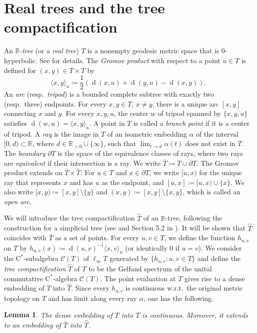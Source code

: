 \documentclass[12pt,nosumlimits,nonamelimits]{amsart}
\newtheorem{lem}[thm]{Lemma}
\theoremstyle{remark}
\theoremstyle{definition}
\newcommand{\IR}{\mathbb{R}}
\newcommand{\rC}{\mathrm{C}}
\newcommand{\cC}{\mathcal{C}}
\DeclareMathOperator{\dist}{d}
\newcommand{\ip}[1]{\mathopen{\langle}#1\mathclose{\rangle}}
\newcommand{\cst}{$\rC^*$-alge\-bra}
\begin{document}
\section{Real trees and the tree compactification}
%
%
An \emph{$\IR$-tree} (or a \emph{real tree}) $T$ 
is a nonempty geodesic metric space that is $0$-hyper\-bolic. 
See \cite{bestvina:survey,chiswell,evans} for details. 
The \emph{Gromov product} with respect 
to a point $u\in T$ is defined for $(x,y)\in T\times T$ by 
\[
\ip{x,y}_u \coloneq \frac{1}{2}(\dist(x,u)+\dist(y,u)-\dist(x,y)).
\] 
An \emph{arc}  (resp.\ \emph{tripod}) is a bounded complete 
subtree with exactly two (resp.\ three) endpoints. 
For every $x,y\in T$, $x\neq y$, there is a unique arc $[x,y]$ 
connecting $x$ and $y$. 
For every $x,y,u$, the center $w$ of tripod spanned by $\{x,y,u\}$ 
satisfies $\dist(w,u) = \ip{x,y}_u$. 
A point in $T$ is called a \emph{branch point} if it is a center of tripod. 
A \emph{ray} is the image in $T$ 
of an isometric embedding $\alpha$ 
of the interval $[0,d)\subset\IR$, 
where $d\in\IR_{>0}\cup\{\infty\}$, 
such that $\lim_{t\to d}\alpha(t)$ does not exist in $T$. 
The \emph{boundary} $\partial T$ is the space 
of the equivalence classes 
of rays, where two rays are \emph{equivalent} 
if their intersection is a ray. 
We write $\bar{T} \coloneq T\cup\partial T$.  
The Gromov product extends on $\bar{T}\times\bar{T}$. 
For $u\in T$ and $x\in\partial T$, we write $[u,x)$ 
for the unique ray that represents $x$ and 
has $u$ as the endpoint, and $[u,x] \coloneq [u,x)\cup\{x\}$. 
We also write $[x,y) \coloneq [x,y]\setminus\{y\}$ and 
$(x,y)\coloneq[x,y]\setminus\{x,y\}$, which is called an \emph{open arc}. 

We will introduce the tree compactification $\hat{T}$ of an $\IR$-tree, 
following the construction for a simplicial tree (see \cite{bowditch,ms} 
and Section 5.2 in \cite{bo}).
It will be shown that $\hat{T}$ coincides with $\bar{T}$ as a set of points. 
For every $u,v\in T$, we define the function $h_{u,v}$ 
on $T$ by $h_{u,v}(x) \coloneq \dist(u,v)^{-1}\ip{x,v}_u$ (or identically 
$0$ if $u=v$). 
We consider the $\rC^*$-sub\-alge\-bra $\cC(T)$ 
of $\ell_\infty T$ generated by $\{ h_{u,v} : u,v\in T\}$ and 
define the \emph{tree compactification} $\hat{T}$ of $T$ to be 
the Gelfand spectrum of the unital commutative 
\cst{} $\cC(T)$.
The point evaluation at $T$ gives rise 
to a dense embedding of $T$ into $\hat{T}$. 
Since every $h_{u,v}$ is continuous 
w.r.t.\ the original metric topology on $T$ 
and has limit along every ray $\alpha$, one has the following. 
%
\begin{lem}
The dense embedding of $T$ into $\hat{T}$ is continuous. 
Moreover, it extends to an embedding of $\bar{T}$ into $\hat{T}$. 
\end{lem}
\end{document}

